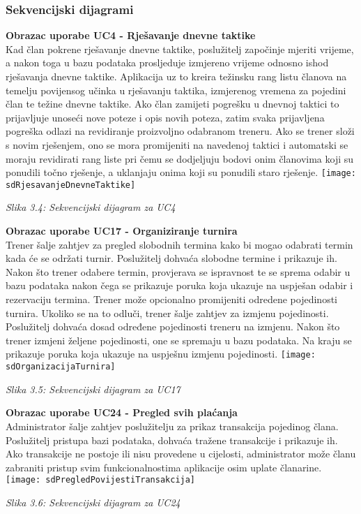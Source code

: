 \documentclass{article}
\begin{document}
		\subsubsection{Sekvencijski dijagrami}
		\textbf{Obrazac uporabe UC4 - Rješavanje dnevne taktike}\\
		Kad član pokrene rješavanje dnevne taktike, poslužitelj započinje mjeriti vrijeme, a nakon toga u bazu podataka prosljeduje izmjereno vrijeme odnosno ishod rješavanja dnevne taktike.
		Aplikacija uz to kreira težinsku rang listu članova na temelju povijensog učinka u rješavanju taktika, izmjerenog vremena za pojedini član te težine dnevne taktike.
		Ako član zamijeti pogrešku u dnevnoj taktici to prijavljuje unoseći nove poteze i opis novih poteza, zatim svaka prijavljena pogreška odlazi na revidiranje proizvoljno odabranom treneru. Ako se trener složi s novim rješenjem, ono se mora promijeniti na navedenoj taktici i automatski se moraju revidirati rang liste pri čemu se dodjeljuju bodovi onim članovima koji su ponudili točno rješenje, a uklanjaju onima koji su ponudili staro rješenje.
		\eject
		\texttt{[image: sdRjesavanjeDnevneTaktike]}
		\begin{center}
			\textit{Slika 3.4: Sekvencijski dijagram za UC4}
		\end{center}
		\eject
		\textbf{Obrazac uporabe UC17 - Organiziranje turnira}\\
		Trener šalje zahtjev za pregled slobodnih termina kako bi mogao odabrati termin kada će se održati turnir. Poslužitelj dohvaća slobodne termine i prikazuje ih. Nakon što trener odabere termin, provjerava se ispravnost te se sprema odabir u bazu podataka nakon čega se prikazuje poruka koja ukazuje na uspješan odabir i rezervaciju termina. Trener može opcionalno promijeniti odredene pojedinosti turnira. Ukoliko se na to odluči, trener šalje zahtjev za izmjenu pojedinosti. Poslužitelj dohvaća dosad određene pojedinosti treneru na izmjenu. Nakon što trener izmjeni željene pojedinosti, one se spremaju u bazu podataka. Na kraju se prikazuje poruka koja ukazuje na uspješnu izmjenu pojedinosti.
		\eject
		\texttt{[image: sdOrganizacijaTurnira]}
		\begin{center}
			\textit{Slika 3.5: Sekvencijski dijagram za UC17}
		\end{center}
		\eject
		\textbf{Obrazac uporabe UC24 - Pregled svih plaćanja}\\
		Administrator šalje zahtjev poslužitelju za prikaz transakcija pojedinog člana. Poslužitelj pristupa bazi podataka, dohvaća tražene transakcije i prikazuje ih. Ako transakcije ne postoje ili nisu provedene u cijelosti, administrator može članu zabraniti pristup svim funkcionalnostima aplikacije osim uplate članarine.
		\eject
		\texttt{[image: sdPregledPovijestiTransakcija]}
		\begin{center}
			\textit{Slika 3.6: Sekvencijski dijagram za UC24}
		\end{center}
		\eject
		
		
\end{document}

